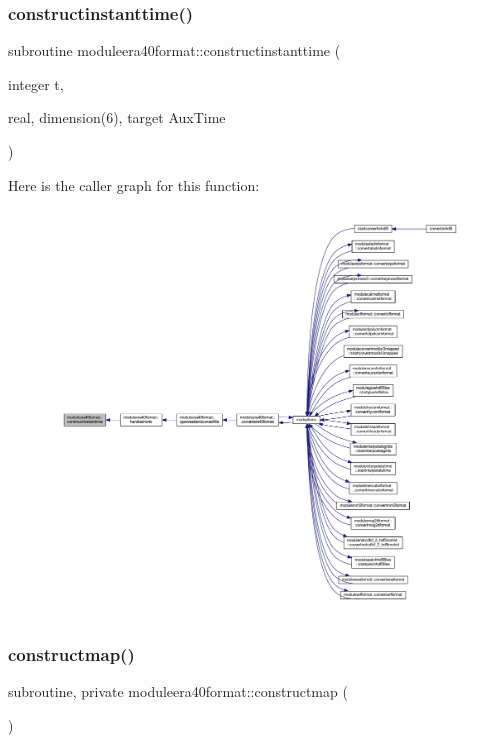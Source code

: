 \subsubsection{\texorpdfstring{constructinstanttime()}{constructinstanttime()}}
{\footnotesize\ttfamily subroutine moduleera40format\+::constructinstanttime (\begin{DoxyParamCaption}\item[{integer}]{t,  }\item[{real, dimension(6), target}]{Aux\+Time }\end{DoxyParamCaption})\hspace{0.3cm}{\ttfamily [private]}}

Here is the caller graph for this function\+:\nopagebreak
\begin{figure}[H]
\begin{center}
\leavevmode
\includegraphics[width=350pt]{namespacemoduleera40format_afe5dcd73c50804212a7b39e48bf7d428_icgraph}
\end{center}
\end{figure}
\mbox{\label{namespacemoduleera40format_a45bd99707035a442354f99cd2597f1e5}} 
\subsubsection{\texorpdfstring{constructmap()}{constructmap()}}
{\footnotesize\ttfamily subroutine, private moduleera40format\+::constructmap (\begin{DoxyParamCaption}{ }\end{DoxyParamCaption})\hspace{0.3cm}{\ttfamily [private]}}

